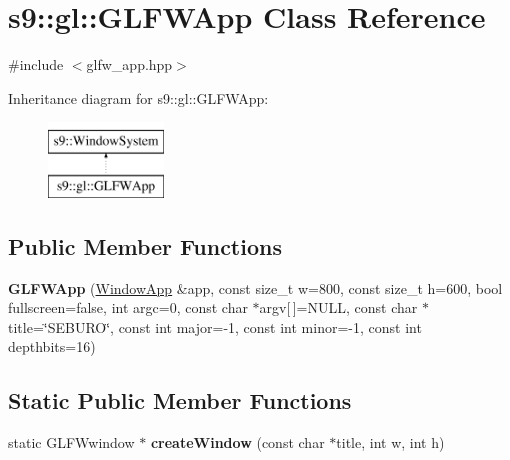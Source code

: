 \hypertarget{classs9_1_1gl_1_1GLFWApp}{\section{s9\-:\-:gl\-:\-:\-G\-L\-F\-W\-App \-Class \-Reference}
\label{classs9_1_1gl_1_1GLFWApp}
}


{\ttfamily \#include $<$glfw\-\_\-app.\-hpp$>$}

\-Inheritance diagram for s9\-:\-:gl\-:\-:\-G\-L\-F\-W\-App\-:\begin{figure}[H]
\begin{center}
\leavevmode
\includegraphics[height=2.000000cm]{classs9_1_1gl_1_1GLFWApp}
\end{center}
\end{figure}
\subsection*{\-Public \-Member \-Functions}
\begin{DoxyCompactItemize}
\item 
\hypertarget{classs9_1_1gl_1_1GLFWApp_a1f6e231130c4731c20d98207b7deda8d}{{\bfseries \-G\-L\-F\-W\-App} (\hyperlink{classs9_1_1WindowApp}{\-Window\-App} \&app, const size\-\_\-t w=800, const size\-\_\-t h=600, bool fullscreen=false, int argc=0, const char $\ast$argv\mbox{[}$\,$\mbox{]}=\-N\-U\-L\-L, const char $\ast$title=\char`\"{}\-S\-E\-B\-U\-R\-O\char`\"{}, const int major=-\/1, const int minor=-\/1, const int depthbits=16)}\label{classs9_1_1gl_1_1GLFWApp_a1f6e231130c4731c20d98207b7deda8d}

\end{DoxyCompactItemize}
\subsection*{\-Static \-Public \-Member \-Functions}
\begin{DoxyCompactItemize}
\item 
\hypertarget{classs9_1_1gl_1_1GLFWApp_a0b5b32a2b20b7ce8eeaf4afd3094eae4}{static \-G\-L\-F\-Wwindow $\ast$ {\bfseries create\-Window} (const char $\ast$title, int w, int h)}\label{classs9_1_1gl_1_1GLFWApp_a0b5b32a2b20b7ce8eeaf4afd3094eae4}

\end{DoxyCompactItemize}
